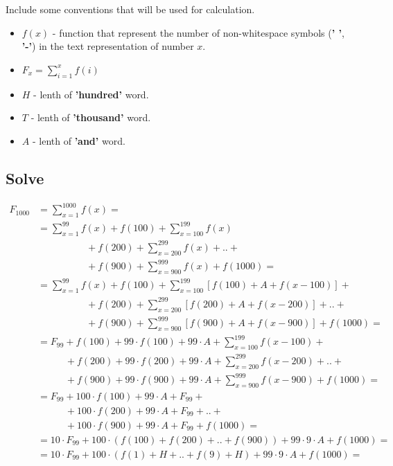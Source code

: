 \documentclass{article}
\begin{document}
Include some conventions that will be used for calculation.
\begin{itemize}
    \item $ f(x) $ - function that represent the number of non-whitespace symbols
          (\textbf{' '}, \textbf{'-'}) in the text representation of number $x$.
    \item $ F_{x} = \sum_{i=1}^{x}{f(i)} $
    \item $H$ - lenth of \textbf{'hundred'} word.
    \item $T$ - lenth of \textbf{'thousand'} word.
    \item $A$ - lenth of \textbf{'and'} word.

\end{itemize}

\subsection{Solve}
\begin{equation*}
    \begin{split}
        F_{1000} & = \sum_{x=1}^{1000}{f(x)} =  \\
        & = \sum_{x=1}^{99}{f(x)} + f(100) + \sum_{x=100}^{199}{f(x)}           \\
        & \qquad \qquad \quad     + f(200) + \sum_{x=200}^{299}{f(x)} + .. + \\
        & \qquad \qquad \quad     + f(900) + \sum_{x=900}^{999}{f(x)} + f(1000) = \\
        & = \sum_{x=1}^{99}{f(x)} + f(100) + \sum_{x=100}^{199}{[f(100) + A + f(x-100)]} + \\
        & \qquad \qquad \quad     + f(200) + \sum_{x=200}^{299}{[f(200) + A + f(x-200)]} + .. + \\
        & \qquad \qquad \quad     + f(900) + \sum_{x=900}^{999}{[f(900) + A + f(x-900)]} + f(1000) = \\
        & = F_{99}      + f(100) + 99 \cdot f(100) + 99 \cdot A + \sum_{x=100}^{199}{f(x-100)} + \\
        & \qquad \;\;\; + f(200) + 99 \cdot f(200) + 99 \cdot A + \sum_{x=200}^{299}{f(x-200)} + .. + \\
        & \qquad \;\;\; + f(900) + 99 \cdot f(900) + 99 \cdot A + \sum_{x=900}^{999}{f(x-900)} + f(1000) = \\
        & = F_{99}      + 100 \cdot f(100) + 99 \cdot A + F_{99} + \\
        & \qquad \;\;\; + 100 \cdot f(200) + 99 \cdot A + F_{99} + .. + \\
        & \qquad \;\;\; + 100 \cdot f(900) + 99 \cdot A + F_{99} + f(1000) = \\
        & = 10 \cdot F_{99} + 100 \cdot (f(100) + f(200) + .. + f(900)) + 99 \cdot 9 \cdot A + f(1000) = \\
        & = 10 \cdot F_{99} + 100 \cdot (f(1) + H + .. + f(9) + H) + 99 \cdot 9 \cdot A + f(1000) =
    \end{split}
\end{equation*}
\end{document}
